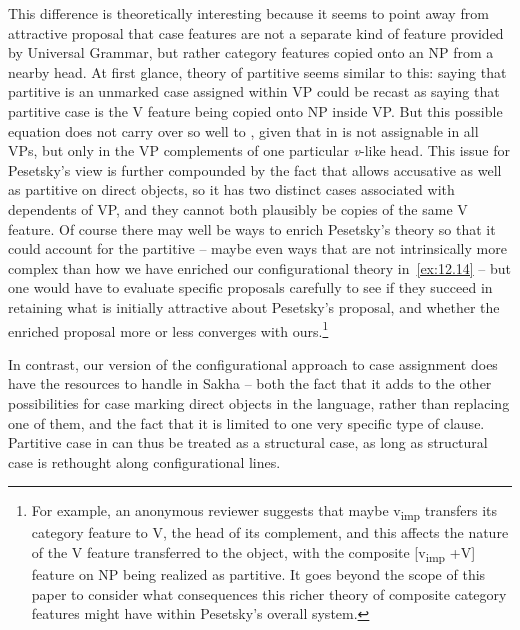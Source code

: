 \documentclass[output=paper]{langsci/langscibook}
\begin{document}
This difference is theoretically interesting because it seems to point away
from  attractive proposal that case features are not a
separate kind of feature provided by Universal Grammar, but rather category
features copied onto an NP from a nearby head. At first glance,
 theory of partitive seems similar to this: saying that
partitive is an unmarked case assigned within VP could be recast as saying that
partitive case is the V feature being copied onto NP inside VP. But this
possible equation does not carry over so well to , given that in
  is not assignable in all VPs, but only in the VP
complements of one particular \emph{v}-like head. This issue for Pesetsky’s view is
further compounded by the fact that  allows accusative as well as
partitive on direct objects, so it has two distinct cases associated with
dependents of VP, and they cannot both plausibly be copies of the same V
feature.  Of course there may well be ways to enrich Pesetsky’s theory so that
it could account for the  partitive -- maybe even ways that are not
intrinsically more complex than how we have enriched our configurational theory
in~\eqref{ex:12.14} -- but one would have to evaluate specific proposals
carefully to see if they succeed in retaining what is initially attractive
about Pesetsky's proposal, and whether the enriched proposal more or less
converges with ours.\footnote{For example, an anonymous reviewer suggests that
    maybe v\textsubscript{imp} transfers its category feature to V, the head of
    its complement, and this affects the nature of the V feature transferred to
    the object, with the composite [v\textsubscript{imp} +V] feature on NP
    being realized as partitive.  It goes beyond the scope of this paper to
    consider what consequences this richer theory of composite category
features might have within Pesetsky’s overall system.}

In contrast, our version of the configurational approach to case assignment
does have the resources to handle  in Sakha -- both the
fact that it adds to the other possibilities for case marking direct objects in
the language, rather than replacing one of them, and the fact that it is
limited to one very specific type of clause. Partitive case in  can
thus be treated as a structural case, as long as structural case is rethought
along configurational lines.
\end{document}
